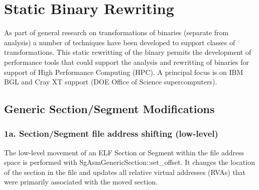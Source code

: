 \section{Static Binary Rewriting}
   As part of general research on transformations of binaries (separate from analysis)
a number of techniques have been developed to support classes of transformations.
This static rewritting of the binary permits the development of performance tools 
that could support the analysis and rewritting of binaries for support of High 
Performance Computing (HPC). A principal focus is on IBM BGL and Cray XT support 
(DOE Office of Science supercomputers).

\subsection{Generic Section/Segment Modifications}

\subsubsection{1a. Section/Segment file address shifting (low-level)}

   The low-level movement of an ELF Section or Segment within the file address space is performed with
   SgAsmGenericSection::set\_offset.  It changes the location of the section in the file and updates all relative virtual
   addresses (RVAs) that were primarily associated with the moved section.

